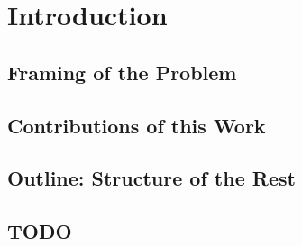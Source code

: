 
\chapter{Introduction}


\section{Framing of the Problem}


\section{Contributions of this Work}

\section{Outline: Structure of the Rest}
\section{TODO}


